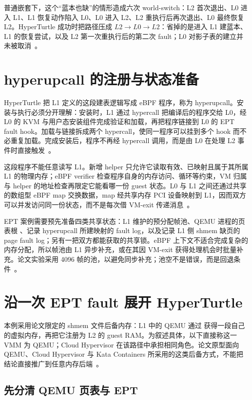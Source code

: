 普通嵌套下，这个“蓝本也缺”的情形造成六次 world-switch：L2 首次退出、L0 进入 L1、L1 恢复动作陷入 L0、L0 进入 L2、L2 重执行后再次退出、L0 最终恢复 L2。HyperTurtle 成功时把路径压成 $L2\rightarrow L0\rightarrow L2$：省掉的是进入 L1 建蓝本、L1 的恢复尝试，以及 L2 第一次重执行后的第二次 fault；L0 对影子表的建立并未被取消~\cite{source8}。

\section{hyperupcall 的注册与状态准备}\label{sec:hyperturtle-design}

HyperTurtle 把 L1 定义的这段建表逻辑写成 eBPF 程序，称为 hyperupcall。安装与执行必须分开理解：安装时，L1 通过 hypercall 把编译后的程序交给 L0，经 L0 的 KVM 与用户态安装组件完成验证和加载，再把程序链接到 L0 的 EPT fault hook。加载与链接拆成两个 hypercall，使同一程序可以挂到多个 hook 而不必重复加载。完成安装后，程序不再经 hypercall 调用，而是由 L0 在处理 L2 事件时直接触发~\cite{source8}。

这段程序不能任意读写 L1。新增 helper  只允许它读取有效、已映射且属于其所属 L1 的物理内存；eBPF verifier 检查程序自身的内存访问、循环等约束，VM 归属与 helper 的地址检查再限定它能看哪一份 guest 状态。L0 与 L1 之间还通过共享的数组型 eBPF map 交换数据，map 经共享内存 PCI 设备映射到 L1，因而双方可以并发访问同一份状态，而不是每次借 VM-exit 传递消息~\cite{source8}。

EPT 案例需要预先准备四类共享状态：L1 维护的预分配帧池、QEMU 进程的页表根 、记录 hyperupcall 所建映射的 fault log，以及记录 L1 侧 shmem 缺页的 page fault log；另有一把双方都能获取的共享锁。eBPF 上下文不适合完成复杂的内存分配，所以帧池由 L1 异步补充，或在其因 VM-exit 获得处理机会时批量补充。论文实验采用 4096 帧的池，以避免同步补充；池空不是错误，而是回退条件~\cite{source8}。

\section{沿一次 EPT fault 展开 HyperTurtle}\label{sec:nested-ht-ept}

本例采用论文限定的 shmem 文件后备内存：L1 中的 QEMU 通过  获得一段自己的虚拟内存，再把它注册为 L2 的 guest RAM。为叙述具体，以下直接称这一 VMM 为 QEMU；Cloud Hypervisor 在该路径中承担相同角色。论文原型面向 QEMU、Cloud Hypervisor 与 Kata Containers 所采用的这类后备方式，不能把结论直接推广到任意内存后端~\cite{source8}。

\subsection{先分清 QEMU 页表与 EPT}\label{sec:ht-qemu-pagetable}

